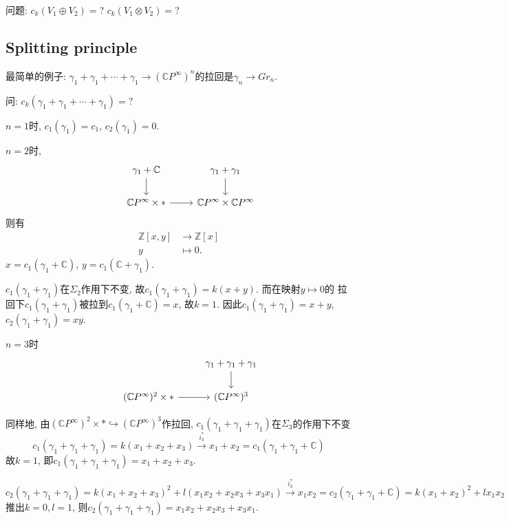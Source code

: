 \quad 问题: $c_k(V_1 \oplus V_2)=$? $c_k(V_1\otimes V_2)=$?

\subsection{Splitting principle}

\quad 最简单的例子: $\gamma_1 +\gamma_1 +\cdots + \gamma_1 
\rightarrow (\mathbb{C}P^\infty)^n$的拉回是$\gamma_n \rightarrow Gr_n$.

问: $c_k(\gamma_1 + \gamma_1 +\cdots +\gamma_1)=$?

\quad $n=1$时, $c_1(\gamma_1) =c_1$, $c_2(\gamma_1) = 0$.

\quad $n=2$时, 
    $$\begin{tikzcd}
        &\gamma_1 + \mathbb{C} \dar &\gamma_1 +\gamma_1 \dar\\
        &\mathbb{C}P^\infty \times * \rar &\mathbb{C}P^\infty\times \mathbb{C}P^\infty
    \end{tikzcd}$$
则有
    \begin{align*}
            \mathbb{Z} [x, y] &\rightarrow \mathbb{Z}[x]\\
                y &\mapsto 0.
    \end{align*}
$x=c_1(\gamma_1 + \mathbb{C})$, $y=c_1(\mathbb{C} +\gamma_1)$.

\quad $c_1(\gamma_1+\gamma_1)$在$\Sigma_2$作用下不变, 
故$c_1(\gamma_1 +\gamma_1) = k(x+y)$. 而在映射$y\mapsto 0$的
拉回下$c_1(\gamma_1+\gamma_1)$被拉到$c_1(\gamma_1+\mathbb{C})=x$, 故$k=1$. 
因此$c_1(\gamma_1 +\gamma_1)=x+y$, $c_2(\gamma_1 +\gamma_1)=xy$.

\quad $n=3$时
    $$\begin{tikzcd}
        & &\gamma_1 +\gamma_1+\gamma_1 \dar\\
        & (\mathbb{C}P^\infty)^2 \times * \rar &(\mathbb{C}P^\infty)^3
    \end{tikzcd}$$

同样地, 由$(\mathbb{C}P^\infty)^2 \times *\hookrightarrow (\mathbb{C}P^\infty)^3$作拉回, 
$c_1(\gamma_1 +\gamma_1 +\gamma_1)$在$\Sigma_3$的作用下不变
    $$c_1(\gamma_1 +\gamma_1+\gamma_1) = k(x_1+x_2+x_3) 
    \stackrel{i_3^*}{\longrightarrow} x_1 +x_2
    = c_1(\gamma_1+\gamma_1+\mathbb{C})$$
故$k=1$, 即$c_1(\gamma_1 +\gamma_1+\gamma_1) = x_1 +x_2+ x_3$.

    $$c_2(\gamma_1+\gamma_1+\gamma_1) 
    = k(x_1+x_2+x_3)^2 + l(x_1x_2+x_2x_3+x_3x_1) 
    \stackrel{i_3^*}{\longrightarrow} x_1x_2 
    = c_2(\gamma_1+\gamma_1+\mathbb{C}) =k(x_1+x_2)^2 +lx_1x_2$$
推出$k=0, l=1$, 则$c_2(\gamma_1+\gamma_1+\gamma_1) = x_1x_2+x_2x_3+x_3x_1$.

